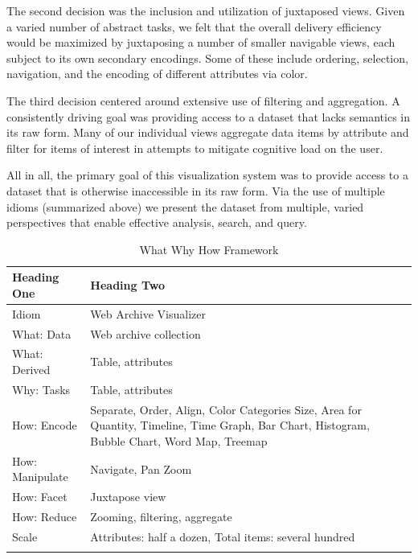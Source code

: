 \documentclass[10pt,journal,compsoc]{IEEEtran}
\begin{document}
The second decision was the inclusion and utilization of juxtaposed views.
Given a varied number of abstract tasks, we felt that the overall delivery efficiency would
be maximized by juxtaposing a number of smaller navigable views, each subject to its
own secondary encodings. Some of these include ordering, selection, navigation, and
the encoding of different attributes via color.

The third decision centered around extensive use of filtering and aggregation. A consistently driving goal 
was providing access to a dataset that lacks semantics in its raw form. Many of our
individual views aggregate data items by attribute and filter for items of interest 
in attempts to mitigate cognitive load on the user. 

All in all, the primary goal of this visualization system was to provide access to a dataset that is otherwise inaccessible in
its raw form. Via the use of multiple idioms (summarized above) we present the dataset
from multiple, varied perspectives that enable effective analysis, search, and query.

\begin{table}
\renewcommand{\arraystretch}{1.3}
\caption{What Why How Framework}
\label{tab:example}
\centering
\begin{tabular}{l|l}
    \hline
    Heading One  &  Heading Two\\
    \hline
    \hline
	Idiom & Web Archive Visualizer \\ \hline
	What: Data & Web archive collection \\ \hline
	What: Derived & Table, attributes \\   \hline
	Why: Tasks & Table, attributes \\  \hline
	How: Encode & \parbox[t]{5cm}{Separate, Order, Align, Color Categories Size, Area for Quantity, Timeline,  Time Graph, Bar Chart, Histogram, Bubble Chart, Word Map, Treemap} \\ \hline
	How: Manipulate & Navigate, Pan Zoom \\  \hline
	How: Facet & Juxtapose view \\  \hline
	How: Reduce & Zooming, filtering, aggregate \\  \hline
Scale & \parbox[t]{5cm}{Attributes: half a dozen, Total items: several hundred} \\
	\\
    \hline
\end{tabular}
\end{table}
\end{document}
